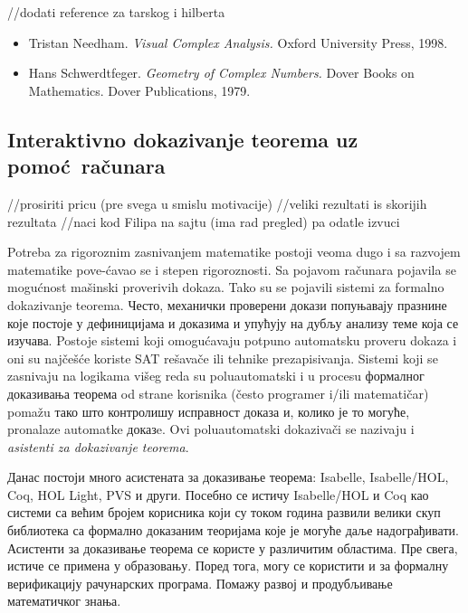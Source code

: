 \documentclass{article}
\begin{document}
//dodati reference za tarskog i hilberta

\begin{itemize}
\item {\lat Tristan Needham. {\em Visual Complex Analysis.} Oxford University Press, 1998.}

\item {\lat Hans Schwerdtfeger. {\em Geometry of Complex Numbers.} Dover Books on Mathematics. Dover
Publications, 1979.}
\end{itemize}

\subsection{Interaktivno dokazivanje teorema uz pomo\'c\ ra\v cunara}

//prosiriti pricu (pre svega u smislu motivacije)
//veliki rezultati is skorijih rezultata
//naci kod Filipa na sajtu (ima rad pregled) pa odatle izvuci

Potreba za rigoroznim zasnivanjem matematike postoji veoma dugo i sa
razvojem matematike pove-\'cavao se i stepen rigoroznosti. Sa pojavom
ra\v cunara pojavila se mogu\'cnost ma\v sinski proverivih
dokaza. Tako su se pojavili sistemi za formalno dokazivanje
teorema. Често, механички проверени докази попуњавају празнине које
постоје у дефиницијама и доказима и упућују на дубљу анализу теме која
се изучава. Postoje sistemi koji omogu\'cavaju potpuno automa{t}{s}ku
proveru dokaza i oni su naj\v ce\v s\'ce koriste {\lat SAT} re\v
sava\v ce ili tehnike prezapisivanja. Sistemi koji se zasnivaju na
logikama vi\v seg reda su poluautoma{t}{s}ki i u procesu формалног
доказивања теорема od strane korisnika (\v cesto programer i/ili
matemati\v car) poma\v zu тако што контролишу исправност доказа и,
колико је то могуће, pronalaze automa{t}\phantom {s}ke доказe. Ovi poluautomatski
dokaziva\v ci se nazivaju i {\em asistenti za dokazivanje teorema}. 

Данас постоји много асистената за доказивање теорема: {\lat Isabelle,
Isabelle/HOL, Coq, HOL Light, PVS} и други. Посебно се истичу {\lat
Isabelle/HOL} и {\lat Coq} као системи са већим бројем корисника који
су током година развили велики скуп библиотека са формално доказаним
теоријама које је могуће даље надограђивати. Асистенти за доказивање
теорема се користе у различитим областима. Пре свега, истиче се
примена у образовању. Поред тога, могу се користити и за формалну
верификацију рачунарских програма. Помажу развој и продубљивање
математичког знања.
\end{document}
